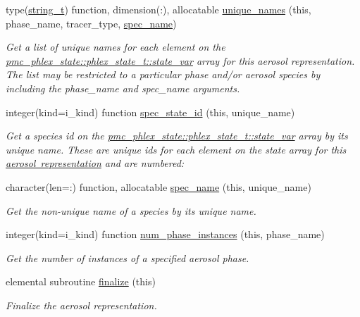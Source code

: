 \begin{DoxyCompactItemize}
type(\mbox{\hyperlink{structpmc__util_1_1string__t}{string\+\_\+t}}) function, dimension(\+:), allocatable \mbox{\hyperlink{namespacepmc__aero__rep__modal__binned__mass_ad8403a50ee93f3bb281012fb75f6decb}{unique\+\_\+names}} (this, phase\+\_\+name, tracer\+\_\+type, \mbox{\hyperlink{interfacepmc__aero__rep__data_1_1spec__name}{spec\+\_\+name}})
\begin{DoxyCompactList}\small\item\em Get a list of unique names for each element on the {\ttfamily \mbox{\hyperlink{structpmc__phlex__state_1_1phlex__state__t_a78835cb552d483ebbfc7a6bc6f756918}{pmc\+\_\+phlex\+\_\+state\+::phlex\+\_\+state\+\_\+t\+::state\+\_\+var}}} array for this aerosol representation. The list may be restricted to a particular phase and/or aerosol species by including the phase\+\_\+name and spec\+\_\+name arguments. \end{DoxyCompactList}\item 
integer(kind=i\+\_\+kind) function \mbox{\hyperlink{namespacepmc__aero__rep__modal__binned__mass_a65da2848167c49c522dceaec65b275dd}{spec\+\_\+state\+\_\+id}} (this, unique\+\_\+name)
\begin{DoxyCompactList}\small\item\em Get a species id on the {\ttfamily \mbox{\hyperlink{structpmc__phlex__state_1_1phlex__state__t_a78835cb552d483ebbfc7a6bc6f756918}{pmc\+\_\+phlex\+\_\+state\+::phlex\+\_\+state\+\_\+t\+::state\+\_\+var}}} array by its unique name. These are unique ids for each element on the state array for this \mbox{\hyperlink{phlex_aero_rep}{aerosol representation}} and are numbered\+: \end{DoxyCompactList}\item 
character(len=\+:) function, allocatable \mbox{\hyperlink{namespacepmc__aero__rep__modal__binned__mass_ade11744688ec5a5d49cec9ce6f53ca66}{spec\+\_\+name}} (this, unique\+\_\+name)
\begin{DoxyCompactList}\small\item\em Get the non-\/unique name of a species by its unique name. \end{DoxyCompactList}\item 
integer(kind=i\+\_\+kind) function \mbox{\hyperlink{namespacepmc__aero__rep__modal__binned__mass_ab3b65af8bf414faf8d25c00c42a3c86f}{num\+\_\+phase\+\_\+instances}} (this, phase\+\_\+name)
\begin{DoxyCompactList}\small\item\em Get the number of instances of a specified aerosol phase. \end{DoxyCompactList}\item 
elemental subroutine \mbox{\hyperlink{namespacepmc__aero__rep__modal__binned__mass_ad6cd49efed6d2028c66061b1faa76ff7}{finalize}} (this)
\begin{DoxyCompactList}\small\item\em Finalize the aerosol representation. \end{DoxyCompactList}\end{DoxyCompactItemize}
